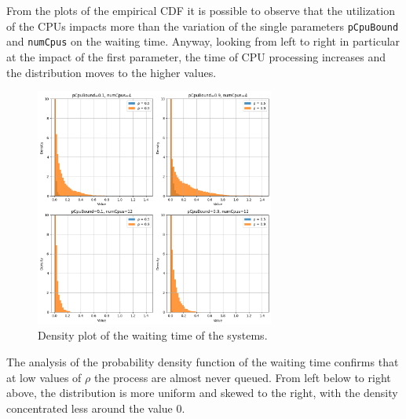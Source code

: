 From the plots of the empirical CDF it is possible to observe that the utilization
of the CPUs impacts more than the variation of the single parameters \texttt{pCpuBound}
and \texttt{numCpus} on the waiting time. Anyway, looking from left to
right in particular at the impact of the first parameter, the time of CPU processing increases
and the distribution moves to the higher values.

\begin{figure}[H]
    \captionsetup{type=figure}
    \centering
    \includegraphics[width=0.7\textwidth]{./images/04/fcfs/wait/density.png}
    \caption{Density plot of the waiting time of the systems.}
    \label{fig:fcfsWaitDensity}
\end{figure}

The analysis of the probability density function of the waiting time confirms
that at low values of $\rho$ the process are almost never queued. From left below to
right above, the distribution is more uniform and skewed to the right, with the density
concentrated less around the value 0.


